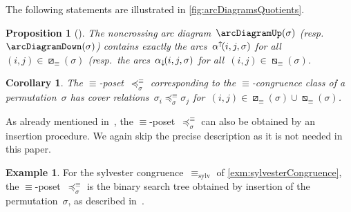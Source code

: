 \documentclass{amsart}
\newtheorem{corollary}[theorem]{Corollary}
\newtheorem{proposition}[theorem]{Proposition}
\theoremstyle{definition}
\newtheorem{example}[theorem]{Example}
\newcommand{\arcDown}{\smash{\alpha_{\downarrow\!}}} %
\newcommand{\arcUp}{\smash{\alpha^{\uparrow\!}}} %
\begin{document}
The following statements are illustrated in \cref{fig:arcDiagramsQuotients}.

\begin{proposition}[{\cite[Sect.~2.4]{Pilaud-arcDiagramAlgebra}}]
\label{prop:insertionMap}
The noncrossing arc diagram~$\arcDiagramUp(\sigma)$ (resp.~$\arcDiagramDown(\sigma)$) contains exactly the arcs~$\arcUp(i,j,\sigma)$ for all~$(i,j) \in \boxslash_\equiv(\sigma)$ (resp.~the arcs~$\arcDown(i,j,\sigma)$ for all~$(i,j) \in \boxbslash_\equiv(\sigma)$.
\end{proposition}

\begin{corollary}
\label{coro:insertionMap}
The $\equiv$-poset~$\preccurlyeq_\sigma^\equiv$ corresponding to the $\equiv$-congruence class of a permutation~$\sigma$ has cover relations~$\sigma_i \preccurlyeq_\sigma^\equiv \sigma_j$ for~$(i,j) \in \boxslash_\equiv(\sigma) \cup \boxbslash_\equiv(\sigma)$.
\end{corollary}

As already mentioned in~\cite[Sect.~2.4]{Pilaud-arcDiagramAlgebra}, the $\equiv$-poset~$\preccurlyeq_\sigma^\equiv$ can also be obtained by an insertion procedure.
We again skip the precise description as it is not needed in this paper.

\begin{example}
For the sylvester congruence~$\equiv_\textrm{sylv}$ of \cref{exm:sylvesterCongruence}, the $\equiv$-poset~$\preccurlyeq_\sigma^\equiv$ is the binary search tree obtained by insertion of the permutation~$\sigma$, as described in~\cite{HivertNovelliThibon-algebraBinarySearchTrees}.
\end{example}
\end{document}
